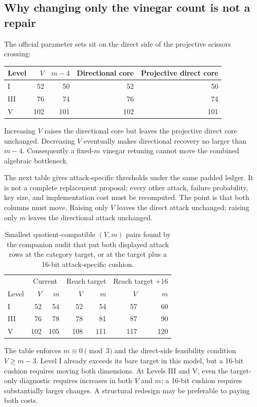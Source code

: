 \documentclass[11pt,a4paper]{article}
\theoremstyle{definition}
\theoremstyle{remark}
\begin{document}
\subsection{Why changing only the vinegar count is not a repair}
The official parameter sets sit on the direct side of the projective scissors
crossing:
\begin{center}
\begin{tabular}{@{}lrrrr@{}}
\toprule
Level & $V$ & $m-4$ & Directional core & Projective direct core\\
\midrule
I&52&50&52&50\\
III&76&74&76&74\\
V&102&101&102&101\\
\bottomrule
\end{tabular}
\end{center}
Increasing $V$ raises the directional core but leaves the projective direct
core unchanged.  Decreasing $V$ eventually makes directional recovery no
larger than $m-4$.  Consequently a fixed-$m$ vinegar retuning cannot move the
combined algebraic bottleneck.

The next table gives attack-specific thresholds under the same padded ledger.
It is not a complete replacement proposal: every other attack, failure
probability, key size, and implementation cost must be recomputed.  The point
is that both columns must move.  Raising only $V$ leaves the direct attack
unchanged; raising only $m$ leaves the directional attack unchanged.

\begin{table}[t]
\centering
\small
\caption{Smallest quotient-compatible $(V,m)$ pairs found by the companion
audit that put both displayed attack rows at the category target, or at the
target plus a 16-bit attack-specific cushion.}
\label{tab:combined-retuning}
\begin{tabular}{@{}lrrrrrr@{}}
\toprule
& \multicolumn{2}{c}{Current} & \multicolumn{2}{c}{Reach target} & \multicolumn{2}{c}{Reach target $+16$}\\
Level & $V$ & $m$ & $V$ & $m$ & $V$ & $m$\\
\midrule
I&52&54&52&54&57&60\\
III&76&78&78&81&87&90\\
V&102&105&108&111&117&120\\
\bottomrule
\end{tabular}
\end{table}

The table enforces $m\equiv0\pmod3$ and the direct-side feasibility condition
$V\ge m-3$.  Level I already exceeds its bare target in this model, but a
16-bit cushion requires moving both dimensions.  At Levels III and V, even the
target-only diagnostic requires increases in both $V$ and $m$; a 16-bit
cushion requires substantially larger changes.  A structural redesign may be
preferable to paying both costs.
\end{document}
